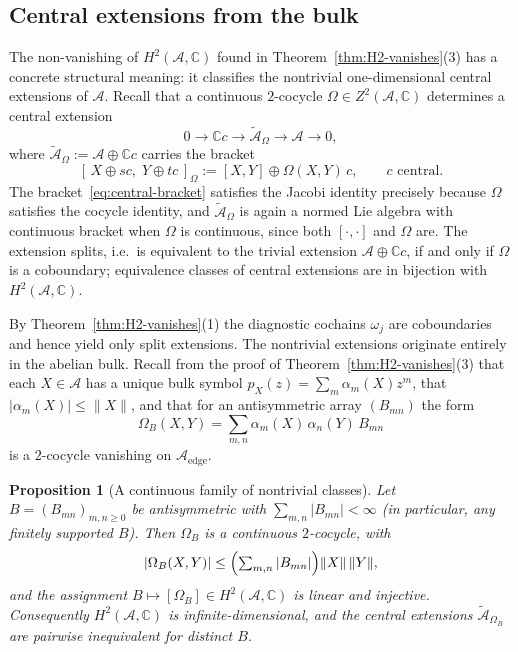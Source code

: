 \documentclass[10pt]{amsart}
\newcommand{\1}{{\mathbb{I}}}
\newtheorem{prop}[theorem]{Proposition}
\numberwithin{equation}{section}
\begin{document}
\subsection{Central extensions from the bulk}
\label{sec:central-ext}

The non-vanishing of $H^2(\mathcal{A},\mathbb{C})$ found in Theorem~\ref{thm:H2-vanishes}(3) has
a concrete structural meaning: it classifies the nontrivial one-dimensional central extensions
of $\mathcal{A}$. Recall that a continuous $2$-cocycle $\Omega\in Z^2(\mathcal{A},\mathbb{C})$
determines a central extension
\[
0 \longrightarrow \mathbb{C}c \longrightarrow \widetilde{\mathcal{A}}_\Omega
\longrightarrow \mathcal{A}\longrightarrow 0,
\]
where $\widetilde{\mathcal{A}}_\Omega := \mathcal{A}\oplus\mathbb{C}c$ carries the bracket
\begin{equation}\label{eq:central-bracket}
[\,X\oplus s c,\; Y\oplus t c\,]_\Omega := [X,Y]\oplus \Omega(X,Y)\,c,
\qquad c \text{ central}.
\end{equation}
The bracket~\eqref{eq:central-bracket} satisfies the Jacobi identity precisely because $\Omega$
satisfies the cocycle identity, and $\widetilde{\mathcal{A}}_\Omega$ is again a normed Lie
algebra with continuous bracket when $\Omega$ is continuous, since both $[\cdot,\cdot]$
and $\Omega$ are. The extension splits, i.e.\ is equivalent to the trivial extension
$\mathcal{A}\oplus\mathbb{C}c$, if and only if $\Omega$ is a coboundary; equivalence classes of
central extensions are in bijection with $H^2(\mathcal{A},\mathbb{C})$.

By Theorem~\ref{thm:H2-vanishes}(1) the diagnostic cochains $\omega_j$ are coboundaries and hence
yield only split extensions. The nontrivial extensions originate entirely in the abelian bulk.
Recall from the proof of Theorem~\ref{thm:H2-vanishes}(3) that each $X\in\mathcal{A}$ has a unique
bulk symbol $p_X(z)=\sum_m\alpha_m(X)z^m$, that $|\alpha_m(X)|\le\|X\|$, and that for an
antisymmetric array $(B_{mn})$ the form
\[
\Omega_B(X,Y)=\sum_{m,n}\alpha_m(X)\,\alpha_n(Y)\,B_{mn}
\]
is a $2$-cocycle vanishing on $\mathcal{A}_{\mathrm{edge}}$.

\begin{prop}[A continuous family of nontrivial classes]\label{prop:central-family}
Let $B=(B_{mn})_{m,n\ge0}$ be antisymmetric with $\sum_{m,n}|B_{mn}|<\infty$ (in particular, any
finitely supported $B$). Then $\Omega_B$ is a continuous $2$-cocycle, with
\[
|\Omega_B(X,Y)|\le\Bigl(\textstyle\sum_{m,n}|B_{mn}|\Bigr)\|X\|\,\|Y\|,
\]
and the assignment $B \mapsto [\Omega_B]\in H^2(\mathcal{A},\mathbb{C})$ is linear and injective.
Consequently $H^2(\mathcal{A},\mathbb{C})$ is infinite-dimensional, and the central extensions
$\widetilde{\mathcal{A}}_{\Omega_B}$ are pairwise inequivalent for distinct $B$.
\end{prop}
\end{document}
